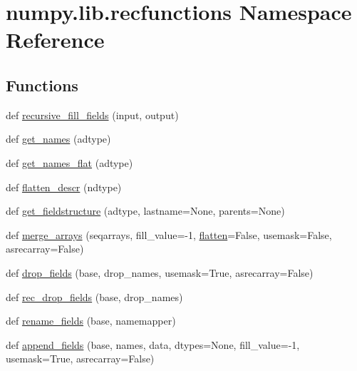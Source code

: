 \hypertarget{namespacenumpy_1_1lib_1_1recfunctions}{}\section{numpy.\+lib.\+recfunctions Namespace Reference}
\label{namespacenumpy_1_1lib_1_1recfunctions}
\subsection*{Functions}
\begin{DoxyCompactItemize}
\item 
def \hyperlink{namespacenumpy_1_1lib_1_1recfunctions_a3a3ab8a90c80d5043f9caf6b04f66e72}{recursive\+\_\+fill\+\_\+fields} (input, output)
\item 
def \hyperlink{namespacenumpy_1_1lib_1_1recfunctions_a985f24a4b67176961d58902435d42700}{get\+\_\+names} (adtype)
\item 
def \hyperlink{namespacenumpy_1_1lib_1_1recfunctions_ab5cfcf21f7e88a2c1d3ba135e1b4dd78}{get\+\_\+names\+\_\+flat} (adtype)
\item 
def \hyperlink{namespacenumpy_1_1lib_1_1recfunctions_ab6dfe0d2538c9ccf8c43f16529ee6984}{flatten\+\_\+descr} (ndtype)
\item 
def \hyperlink{namespacenumpy_1_1lib_1_1recfunctions_ab6792feb20aacdff2d1b1907a65c9add}{get\+\_\+fieldstructure} (adtype, lastname=None, parents=None)
\item 
def \hyperlink{namespacenumpy_1_1lib_1_1recfunctions_a5fb7c301da028b4334869427b9832c10}{merge\+\_\+arrays} (seqarrays, fill\+\_\+value=-\/1, \hyperlink{size_2foo_8f90_a5b6fedc75d027f2d0e1cea960deeec4e}{flatten}=False, usemask=False, asrecarray=False)
\item 
def \hyperlink{namespacenumpy_1_1lib_1_1recfunctions_a9d7d4636850989f9f106bb09d8512b53}{drop\+\_\+fields} (base, drop\+\_\+names, usemask=True, asrecarray=False)
\item 
def \hyperlink{namespacenumpy_1_1lib_1_1recfunctions_a3c0a086ab91ef24162647b57675e8958}{rec\+\_\+drop\+\_\+fields} (base, drop\+\_\+names)
\item 
def \hyperlink{namespacenumpy_1_1lib_1_1recfunctions_a5a5dc203d0562d6eccd70e7230bb9c6e}{rename\+\_\+fields} (base, namemapper)
\item 
def \hyperlink{namespacenumpy_1_1lib_1_1recfunctions_a825baec922c4794416c1dee8f815e0d7}{append\+\_\+fields} (base, names, data, dtypes=None, fill\+\_\+value=-\/1, usemask=True, asrecarray=False)

\end{DoxyCompactItemize}
